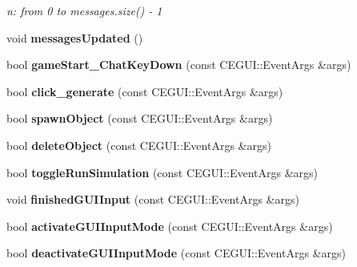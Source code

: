 \begin{DoxyCompactItemize}
\begin{DoxyCompactList}\small\item\em n\-: from 0 to messages.\-size() -\/ 1 \end{DoxyCompactList}\item 
\hypertarget{classGame_ad401319a7143f69ad0f19a7f5fa8a346}{
void {\bfseries messages\-Updated} ()}
\label{d9/d68/classGame_ad401319a7143f69ad0f19a7f5fa8a346}

\item 
\hypertarget{classGame_ae1d943daabd5d4bef8d46d3e99f55b9e}{
bool {\bfseries game\-Start\-\_\-\-Chat\-Key\-Down} (const \-C\-E\-G\-U\-I\-::\-Event\-Args \&args)}
\label{d9/d68/classGame_ae1d943daabd5d4bef8d46d3e99f55b9e}

\item 
\hypertarget{classGame_a567070e3eca2250b00764009ed2b23e5}{
bool {\bfseries click\-\_\-generate} (const \-C\-E\-G\-U\-I\-::\-Event\-Args \&args)}
\label{d9/d68/classGame_a567070e3eca2250b00764009ed2b23e5}

\item 
\hypertarget{classGame_add9024280000ed753b54859b0f6df9d8}{
bool {\bfseries spawn\-Object} (const \-C\-E\-G\-U\-I\-::\-Event\-Args \&args)}
\label{d9/d68/classGame_add9024280000ed753b54859b0f6df9d8}

\item 
\hypertarget{classGame_a084e66adb59ba553b7aee6d29de3156c}{
bool {\bfseries delete\-Object} (const \-C\-E\-G\-U\-I\-::\-Event\-Args \&args)}
\label{d9/d68/classGame_a084e66adb59ba553b7aee6d29de3156c}

\item 
\hypertarget{classGame_a2ba918259f4aa0532a8c229c7ea3bd34}{
bool {\bfseries toggle\-Run\-Simulation} (const \-C\-E\-G\-U\-I\-::\-Event\-Args \&args)}
\label{d9/d68/classGame_a2ba918259f4aa0532a8c229c7ea3bd34}

\item 
\hypertarget{classGame_a0b787e169edca37721945fefc1ef590b}{
void {\bfseries finished\-G\-U\-I\-Input} (const \-C\-E\-G\-U\-I\-::\-Event\-Args \&args)}
\label{d9/d68/classGame_a0b787e169edca37721945fefc1ef590b}

\item 
\hypertarget{classGame_a214858e1af3daaab8865b4b19ad1a139}{
bool {\bfseries activate\-G\-U\-I\-Input\-Mode} (const \-C\-E\-G\-U\-I\-::\-Event\-Args \&args)}
\label{d9/d68/classGame_a214858e1af3daaab8865b4b19ad1a139}

\item 
\hypertarget{classGame_ae5f44b6397cc9f806c27bb1051b93e48}{
bool {\bfseries deactivate\-G\-U\-I\-Input\-Mode} (const \-C\-E\-G\-U\-I\-::\-Event\-Args \&args)}
\label{d9/d68/classGame_ae5f44b6397cc9f806c27bb1051b93e48}


\end{DoxyCompactItemize}
